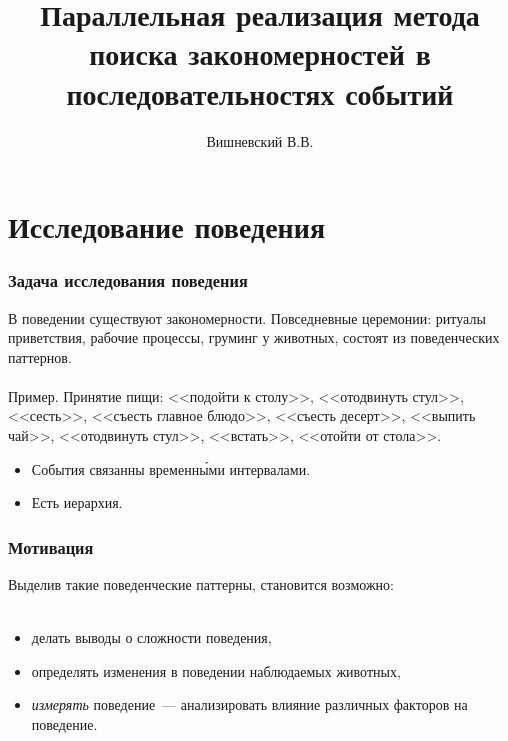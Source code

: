 \documentclass[smaller]{beamer}
\title[P-Паттерны]{Параллельная реализация метода поиска закономерностей в последовательностях событий} %
\author %
[~]{Вишневский В.В.}
\begin{document}
\begin{frame}
  \titlepage
\end{frame}




\section{Исследование поведения}

\begin{frame}	
  \frametitle{Задача исследования поведения}
В поведении существуют закономерности. Повседневные
церемонии: ритуалы приветствия, рабочие процессы, груминг у животных,
состоят из поведенческих паттернов.
\\~\\

Пример. Принятие пищи: <<подойти к столу>>, 
<<отодвинуть стул>>, <<сесть>>, <<съесть главное блюдо>>, 
<<съесть десерт>>, <<выпить чай>>, <<отодвинуть стул>>,
<<встать>>, <<отойти от стола>>.

\begin{itemize}
 \item События связанны временн\'{ы}ми интервалами.
 \item Есть иерархия.
\end{itemize}

\end{frame}


\begin{frame}	
  \frametitle{Мотивация}
Выделив такие поведенческие паттерны, становится возможно:
\\~\\
\begin{itemize}
  \item делать выводы о сложности поведения,
  \item определять изменения в поведении наблюдаемых животных,
  \item {\em измерять} поведение~--- анализировать влияние 
	различных факторов на поведение.
\end{itemize}
\end{frame}
\end{document}
